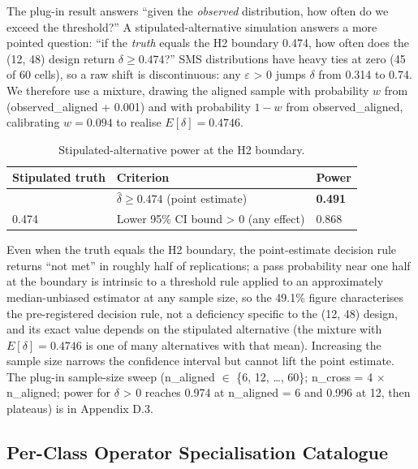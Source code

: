 \documentclass[manuscript,screen,review]{acmart}
\begin{document}
The plug-in result answers ``given the \emph{observed} distribution, how often do
we exceed the threshold?'' A stipulated-alternative simulation answers a more
pointed question: ``if the \emph{truth} equals the H2 boundary 0.474, how often
does the (12, 48) design return $\delta \geq 0.474$?'' SMS distributions have
heavy ties at zero (45 of 60 cells), so a raw shift is discontinuous: any
$\varepsilon$ \textgreater{} 0 jumps $\delta$ from 0.314 to 0.74. We therefore use
a mixture, drawing the aligned sample with probability $w$ from
(observed\_aligned + 0.001) and with probability $1-w$ from observed\_aligned,
calibrating $w = 0.094$ to realise $E[\delta] = 0.4746$.

{%
\begin{longtable}[]{@{}lll@{}}
\caption{Stipulated-alternative power at the H2 boundary.}\label{tab:power-stipulated-full}\\
\toprule\noalign{}
Stipulated truth & Criterion & Power \\
\midrule\noalign{}
\endhead
\bottomrule\noalign{}
\endlastfoot
0.474 & $\hat{\delta} \geq 0.474$ (point estimate) & \textbf{0.491} \\
0.474 & Lower 95\% CI bound \textgreater{} 0 (any effect) & 0.868 \\
\end{longtable}
}

Even when the truth equals the H2 boundary, the point-estimate decision rule
returns ``not met'' in roughly half of replications; a pass probability near one
half at the boundary is intrinsic to a threshold rule applied to an approximately
median-unbiased estimator at any sample size, so the 49.1\% figure characterises
the pre-registered decision rule, not a deficiency specific to the (12, 48)
design, and its exact value depends on the stipulated alternative (the mixture
with $E[\delta] = 0.4746$ is one of many alternatives with that mean). Increasing
the sample size narrows the confidence interval but cannot lift the point
estimate. The plug-in sample-size sweep (n\_aligned $\in$ \{6, 12, \ldots, 60\};
n\_cross = 4 $\times$ n\_aligned; power for $\delta$ \textgreater{} 0 reaches 0.974
at n\_aligned = 6 and 0.996 at 12, then plateaus) is in Appendix D.3.

\subsection{Per-Class Operator Specialisation Catalogue}\label{k.5-operator-specialisation-catalogue}
\end{document}
